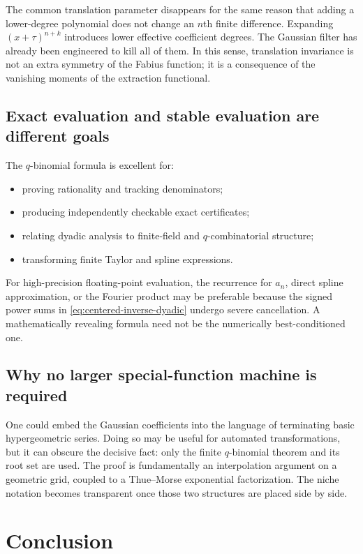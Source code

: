 \documentclass[11pt]{article}
\theoremstyle{definition}
\begin{document}
The common translation parameter disappears for the same reason that adding a lower-degree polynomial does not change an $n$th finite difference.  Expanding
$(x+\tau)^{n+k}$ introduces lower effective coefficient degrees.  The Gaussian filter has already been engineered to kill all of them.  In this sense, translation invariance is not an extra symmetry of the Fabius function; it is a consequence of the vanishing moments of the extraction functional.

\subsection{Exact evaluation and stable evaluation are different goals}

The $q$-binomial formula is excellent for:
\begin{itemize}[leftmargin=2em]
  \item proving rationality and tracking denominators;
  \item producing independently checkable exact certificates;
  \item relating dyadic analysis to finite-field and $q$-combinatorial structure;
  \item transforming finite Taylor and spline expressions.
\end{itemize}
For high-precision floating-point evaluation, the recurrence for $a_n$, direct spline approximation, or the Fourier product may be preferable because the signed power sums in \cref{eq:centered-inverse-dyadic} undergo severe cancellation.  A mathematically revealing formula need not be the numerically best-conditioned one.

\subsection{Why no larger special-function machine is required}

One could embed the Gaussian coefficients into the language of terminating basic hypergeometric series.  Doing so may be useful for automated transformations, but it can obscure the decisive fact: only the finite $q$-binomial theorem and its root set are used.  The proof is fundamentally an interpolation argument on a geometric grid, coupled to a Thue--Morse exponential factorization.  The niche notation becomes transparent once those two structures are placed side by side.

\section{Conclusion}
\end{document}
